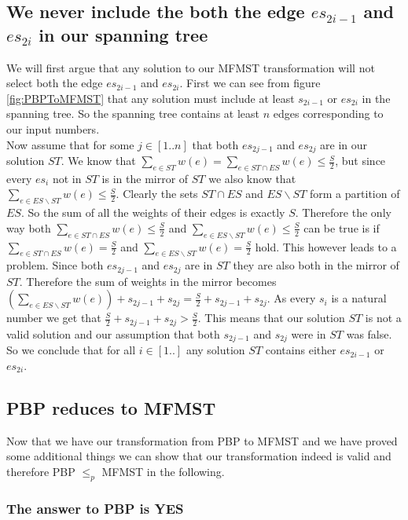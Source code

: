 \subsection*{We never include the both the edge $es_{2i-1}$ and $es_{2i}$ in our spanning tree}
We will first argue that any solution to our MFMST transformation will not select both the edge $es_{2i-1}$ and $es_{2i}$. First we can see from figure \ref{fig:PBPToMFMST}  that any solution must include at least $s_{2i-1}$ or $es_{2i}$ in the spanning tree. So the spanning tree contains at least $n$ edges corresponding to our input numbers. \\
Now assume that for some $j\in [1..n]$ that both $es_{2j-1}$ and $es_{2j}$ are in our solution $ST$. We know that $\sum_{e\in ST} w(e) = \sum_{e\in ST\cap ES} w(e) \leq \frac{S}{2}$, but since every $es_i$ not in $ST$ is in the mirror of $ST$ we also know that $\sum_{e\in ES\backslash ST}w(e) \leq \frac{S}{2}$. Clearly the sets $ST \cap ES$ and $ES \backslash ST$ form a partition of $ES$. So the sum of all the weights of their edges is exactly $S$. Therefore the only way both $\sum_{e\in ST\cap ES} w(e) \leq \frac{S}{2}$ and $\sum_{e\in ES\backslash ST}w(e) \leq \frac{S}{2}$ can be true is if 
$\sum_{e\in ST\cap ES} w(e) = \frac{S}{2}$ and $\sum_{e\in ES\backslash ST}w(e) = \frac{S}{2}$ hold. This however leads to a problem. Since both $es_{2j-1}$ and $es_{2j}$ are in $ST$ they are also both in the mirror of $ST$. Therefore the sum of weights in the mirror becomes $(\sum_{e\in ES\backslash ST} w(e)) + s_{2j-1} + s_{2j} = \frac{S}{2} + s_{2j-1} + s_{2j}$. As every $s_i$ is a natural number we get that $\frac{S}{2} + s_{2j-1} + s_{2j} > \frac{S}{2}$. This means that our solution $ST$ is not a valid solution and our assumption that both $s_{2j-1}$ and $s_{2j}$ were in $ST$ was false. So we conclude that for all $i\in[1..]$ any solution $ST$ contains either $es_{2i-1}$ or $es_{2i}$.

\subsection*{PBP reduces to MFMST}
Now that we have our transformation from PBP to MFMST and we have proved some additional things we can show that our transformation indeed is valid and therefore PBP $\leq_p$ MFMST in the following. 

\subsubsection*{The answer to PBP is YES}

